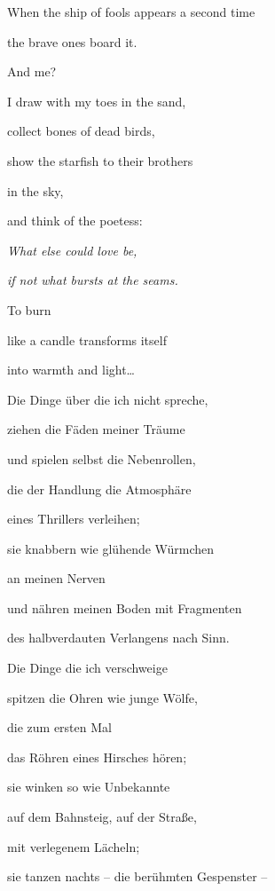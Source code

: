 \documentclass[a4paper]{article}
\begin{document}
When the ship of fools appears a second time

the brave ones board it.

And me? 


\bigskip

I draw with my toes in the sand,

collect bones of dead birds,

show the starfish to their brothers

in the sky,


\bigskip

and think of the poetess:

{\itshape
What else could love be,}

{\itshape
if not what bursts at the seams.}


\bigskip

To burn

like a candle transforms itself

into warmth and light…


\bigskip


\bigskip



\bigskip


\bigskip

Die Dinge über die ich nicht spreche, 

ziehen die Fäden meiner Träume

und spielen selbst die Nebenrollen,

die der Handlung die Atmosphäre

eines Thrillers verleihen;

sie knabbern wie glühende Würmchen 

an meinen Nerven

und nähren meinen Boden mit Fragmenten

des halbverdauten Verlangens nach Sinn.


\bigskip

Die Dinge die ich verschweige

spitzen die Ohren wie junge Wölfe,

die zum ersten Mal 

das Röhren eines Hirsches hören;

sie winken so wie Unbekannte

auf dem Bahnsteig, auf der Straße, 

mit verlegenem Lächeln;

sie tanzen nachts – die berühmten Gespenster –
\end{document}
